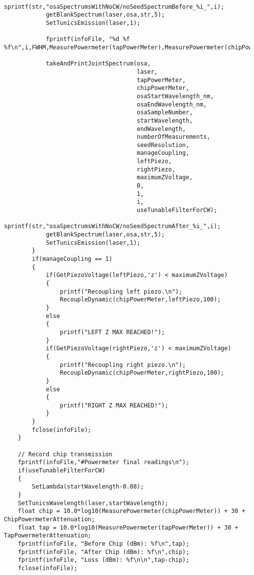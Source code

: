 \begin{lstlisting}
            sprintf(str,"osaSpectrumsWithNoCW/noSeedSpectrumBefore_%i_",i);
            getBlankSpectrum(laser,osa,str,5);
            SetTunicsEmission(laser,1);

            fprintf(infoFile, "%d %f %f\n",i,FWHM,MeasurePowermeter(tapPowerMeter),MeasurePowermeter(chipPowerMeter));

            takeAndPrintJointSpectrum(osa,
                                      laser,
                                      tapPowerMeter,
                                      chipPowerMeter,
                                      osaStartWavelength_nm,
                                      osaEndWavelength_nm,
                                      osaSampleNumber,
                                      startWavelength,
                                      endWavelength,
                                      numberOfMeasurements,
                                      seedResolution,
                                      manageCoupling,
                                      leftPiezo,
                                      rightPiezo,
                                      maximumZVoltage,
                                      0,
                                      1,
                                      i,
                                      useTunableFilterForCW);
            sprintf(str,"osaSpectrumsWithNoCW/noSeedSpectrumAfter_%i_",i);
            getBlankSpectrum(laser,osa,str,5);
            SetTunicsEmission(laser,1);
        }
        if(manageCoupling == 1)
        {
            if(GetPiezoVoltage(leftPiezo,'z') < maximumZVoltage)
            {
                printf("Recoupling left piezo.\n");
                RecoupleDynamic(chipPowerMeter,leftPiezo,100);
            }
            else
            {
                printf("LEFT Z MAX REACHED!");
            }
            if(GetPiezoVoltage(rightPiezo,'z') < maximumZVoltage)
            {
                printf("Recoupling right piezo.\n");
                RecoupleDynamic(chipPowerMeter,rightPiezo,100);
            }
            else
            {
                printf("RIGHT Z MAX REACHED!");
            }
        }
        fclose(infoFile);
    }

    // Record chip transmission
    fprintf(infoFile,"#Powermeter final readings\n");
    if(useTunableFilterForCW)
    {
        SetLambda(startWavelength-0.08);
    }
    SetTunicsWavelength(laser,startWavelength);
    float chip = 10.0*log10(MeasurePowermeter(chipPowerMeter)) + 30 + ChipPowermeterAttenuation;
    float tap = 10.0*log10(MeasurePowermeter(tapPowerMeter)) + 30 + TapPowermeterAttenuation;
    fprintf(infoFile, "Before Chip (dBm): %f\n",tap);
    fprintf(infoFile, "After Chip (dBm): %f\n",chip);
    fprintf(infoFile, "Loss (dBm): %f\n\n",tap-chip);
    fclose(infoFile);



\end{lstlisting}
